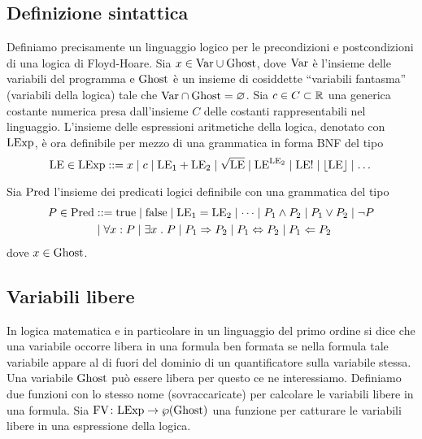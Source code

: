\subsection{Definizione sintattica}

Definiamo precisamente un linguaggio logico per le
precondizioni e postcondizioni di una logica di Floyd-Hoare.
Sia $x \in \mathrm{Var} \cup \mathrm{Ghost}$, dove $\mathrm{Var}$ è l'insieme delle variabili del
programma e $\mathrm{Ghost}$ è un insieme di cosiddette ``variabili fantasma''
(variabili della logica) tale che $\mathrm{Var} \cap \mathrm{Ghost} = \varnothing$.
Sia $c \in C \subset \mathbb{R}$ una generica costante numerica presa dall'insieme
$C$ delle costanti rappresentabili nel linguaggio.
L'insieme delle espressioni aritmetiche della logica, denotato con $\mathrm{LExp}$,
è ora definibile per mezzo di una grammatica in forma BNF del tipo
\[
  \mathrm{LE} \in \mathrm{LExp} ::= x
                \mathrel{\mid} c
                \mathrel{\mid} \mathrm{LE}_1 + \mathrm{LE}_2
                \mathrel{\mid} \sqrt{\mathrm{LE}}
                \mathrel{\mid} \mathrm{LE}^{\mathrm{LE}_2}
                \mathrel{\mid} \mathrm{LE}!
                \mathrel{\mid} \lfloor \mathrm{LE} \rfloor
                \mathrel{\mid} \dots
\]

Sia $\mathrm{Pred}$ l'insieme dei predicati logici definibile con una grammatica
del tipo
\begin{align*}
P \in \Pred &::= \true
            \vbar \false
            \vbar\LE_1 = \LE_2
            \vbar \dots
            \vbar P_1 \land P_2
            \vbar P_1 \lor P_2
            \vbar \neg P \\
            &\vbar \forall x \itc P
            \vbar \exists x \st P
            \vbar P_1 \Rightarrow P_2
            \vbar P_1 \Leftrightarrow P_2 \vbar P_1 \Leftarrow P_2
\end{align*}
dove $x \in\mathrm{Ghost}$.

\subsection{Variabili libere}
In logica matematica e in particolare in un linguaggio del primo ordine si dice che una variabile occorre libera in una formula ben formata se nella formula tale variabile appare al di fuori del dominio di un quantificatore sulla variabile stessa. Una variabile $\mathrm{Ghost}$ può essere libera per questo ce ne interessiamo.
Definiamo due funzioni con lo stesso nome (sovraccaricate) per calcolare le variabili libere in una formula.
Sia $\mathord{\mathrm{FV}}\colon\mathrm{LExp}\to\wp(\mathrm{Ghost})$ una funzione per catturare le variabili libere in una espressione della logica.

